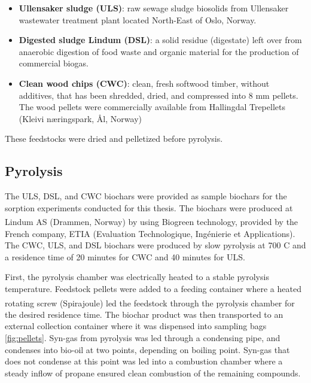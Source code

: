 \begin{itemize}
    \item \textbf{Ullensaker sludge (ULS)}: raw sewage sludge biosolids from Ullensaker wastewater treatment plant located North-East of Oslo, Norway. 
    \item \textbf{Digested sludge Lindum (DSL)}: a solid residue (digestate) left over from anaerobic digestion of food waste and organic material for the production of commercial biogas.
    \item \textbf{Clean wood chips (CWC)}: clean, fresh softwood timber, without additives, that has been shredded, dried, and compressed into 8 mm pellets. The wood pellets were commercially available from Hallingdal Trepellets (Kleivi næringspark, Ål, Norway)
\end{itemize}

These feedstocks were dried and pelletized before pyrolysis.

\subsection{Pyrolysis}
The ULS, DSL, and CWC biochars were provided as sample biochars for the sorption experiments conducted for this thesis. The biochars were produced at Lindum AS (Drammen, Norway) by using Biogreen\textsuperscript{\textcopyright} technology, provided by the French company, ETIA (Evaluation Technologique, Ingénierie et Applications). The CWC, ULS, and DSL biochars were produced by slow pyrolysis at 700 \textdegree C and a residence time of 20 minutes for CWC and 40 minutes for ULS. 

First, the pyrolysis chamber was electrically heated to a stable pyrolysis temperature. Feedstock pellets were added to a feeding container where a heated rotating screw (Spirajoule\textsuperscript{\textregistered}) led the feedstock through the pyrolysis chamber for the desired residence time. The biochar product was then transported to an external collection container where it was dispensed into sampling bags \cref{fig:pellets}. Syn-gas from pyrolysis was led through a condensing pipe, and condenses into bio-oil at two points, depending on boiling point. Syn-gas that does not condense at this point was led into a combustion chamber where a steady inflow of propane ensured clean combustion of the remaining compounds.

